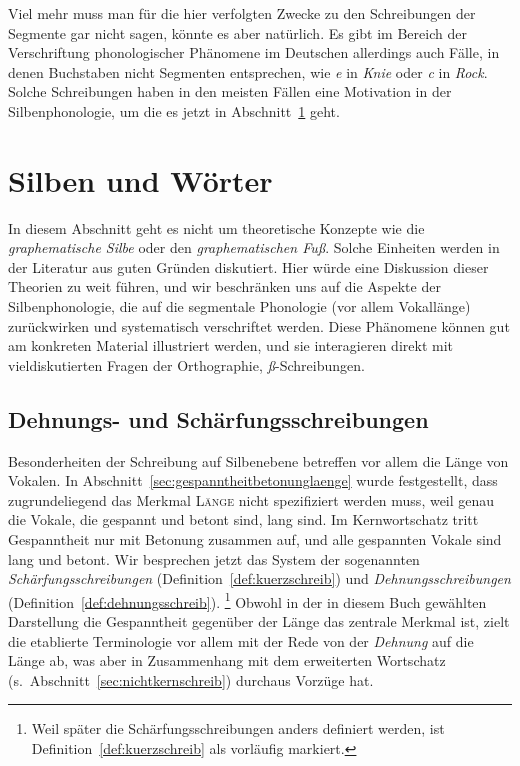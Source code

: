 Viel mehr muss man für die hier verfolgten Zwecke zu den Schreibungen der Segmente gar nicht sagen, könnte es aber natürlich.
Es gibt im Bereich der Verschriftung phonologischer Phänomene im Deutschen allerdings auch Fälle, in denen Buchstaben nicht Segmenten entsprechen, wie \textit{e} in \textit{Knie} oder \textit{c} in \textit{Rock}.
Solche Schreibungen haben in den meisten Fällen eine Motivation in der Silbenphonologie, um die es jetzt in Abschnitt~\ref{sec:silbenschreib} geht.




\section{Silben und Wörter}

\label{sec:silbenschreib}

In diesem Abschnitt geht es nicht um theoretische Konzepte wie die \textit{graphematische Silbe} oder den \textit{graphematischen Fuß}.
Solche Einheiten werden in der Literatur aus guten Gründen diskutiert.
Hier würde eine Diskussion dieser Theorien zu weit führen, und wir beschränken uns auf die Aspekte der Silbenphonologie, die auf die segmentale Phonologie (vor allem Vokallänge) zurückwirken und systematisch verschriftet werden.
Diese Phänomene können gut am konkreten Material illustriert werden, und sie interagieren direkt mit vieldiskutierten Fragen der Orthographie, \zB \textit{ß}-Schreibungen.

\subsection{Dehnungs- und Schärfungsschreibungen}

\label{sec:laengeschreib}

Besonderheiten der Schreibung auf Silbenebene betreffen vor allem die Länge von Vokalen.
In Abschnitt~\ref{sec:gespanntheitbetonunglaenge} wurde festgestellt, dass zugrundeliegend das Merkmal \textsc{Länge} nicht spezifiziert werden muss, weil genau die Vokale, die gespannt und betont sind, lang sind.
Im Kernwortschatz tritt Gespanntheit nur mit Betonung zusammen auf, und alle gespannten Vokale sind lang und betont.
Wir besprechen jetzt das System der sogenannten \textit{Schärfungsschreibungen} (Definition~\ref{def:kuerzschreib}) und \textit{Dehnungsschreibungen} (Definition~\ref{def:dehnungsschreib}).%
\footnote{Weil später die Schärfungsschreibungen anders definiert werden, ist Definition~\ref{def:kuerzschreib} als vorläufig markiert.}
Obwohl in der in diesem Buch gewählten Darstellung die Gespanntheit gegenüber der Länge das zentrale Merkmal ist, zielt die etablierte Terminologie vor allem mit der Rede von der \textit{Dehnung} auf die Länge ab, was aber in Zusammenhang mit dem erweiterten Wortschatz (s.\ Abschnitt~\ref{sec:nichtkernschreib}) durchaus Vorzüge hat.

